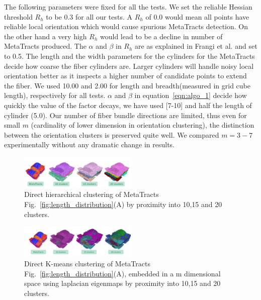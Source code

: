 The following parameters were fixed for all the tests. We set the reliable Hessian threshold $R_{h}$ to be 0.3 for all our tests. A $R_{h}$ of 0.0 would mean all points have reliable local orientation which would cause spurious MetaTracts detection. On the other hand a very high $ R_{h}$ would lead to be a decline in number of MetaTracts produced. The $\alpha$ and $\beta$ in $R_{h}$ are as explained in Frangi et al. \cite{Frangi1998} and set to 0.5. The length and the width parameters for the cylinders for the MetaTracts decide how coarse the fiber cylinders are. Larger cylinders will handle noisy local orientation better as it inspects a higher number of candidate points to extend the fiber. We used 10.00 and 2.00 for length and breadth(measured in grid cube length), respectively for all tests. $\alpha$ and $\beta$ in equation~\ref{eqn:algo_1} decide how quickly the value of the factor decays, we have used [7-10] and half the length of cylinder (5.0). Our number of fiber bundle directions are limited, thus even for small $m$ (cardinality of lower dimension in orientation clustering), the distinction between the orientation clusters is preserved quite well. We compared  $m=3-7$ experimentally without any dramatic change in results. 
\begin{figure}[tb]
	\centering
	\includegraphics[width=0.5\textwidth, trim = 0mm 80mm 0mm 170mm, clip]{images_pvis/figure10}
	\caption{Direct hierarchical clustering of MetaTracts Fig.~\ref{fig:length_distribution}(A) by proximity into 10,15 and 20 clusters.}
	\label{fig:comparison}
\end{figure}


\begin{figure}[tb]
	\centering
	\includegraphics[width=0.5\textwidth, trim = 0mm 80mm 0mm 170mm, clip]{images_pvis/comparison_orient}
	\caption{Direct K-means clustering of MetaTracts Fig.~\ref{fig:length_distribution}(A), embedded in a m dimensional space using laplacian eigenmaps by proximity into 10,15 and 20 clusters.}
	\label{fig:comparison_orient}
\end{figure} 

